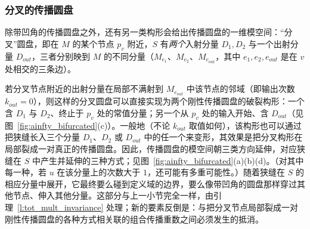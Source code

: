 \subsubsection{分叉的传播圆盘}\label{sss:bifurcated}

除带凹角的传播圆盘之外，还有另一类构形会给出传播圆盘的一维模空间：``分叉''圆盘，即在 $M$ 的某个节点 $p_v$ 附近，$S$ 有\emph{两个}入射分量 $D_1,D_2$ 与一个出射分量 $D_{out}$，三者分别映到 $M$ 的不同分量（$M_{e_1}$、$M_{e_2}$、$M_{e_{out}}$，其中 $e_1,e_2,e_{out}$ 是在 $v$ 处相交的三条边）。

若分叉节点附近的出射分量在局部不满射到 $M_{e_{out}}$ 中该节点的邻域（即输出次数 $k_{out}=0$），则这样的分叉圆盘可以直接实现为两个刚性传播圆盘的破裂构形：一个含 $D_1$ 与 $D_2$、终止于 $p_v$ 处的常值分量；另一个从 $p_v$ 处的输入开始、含 $D_{out}$（见图~\ref{fig:ainfty_bifurcated}(c)）。一般地（不论 $k_{out}$ 取值如何），该构形也可以通过把狭缝长入三个分量 $D_1$、$D_2$ 或 $D_{out}$ 中的任一个来变形，其效果是把分叉构形在局部裂成一对真正的传播圆盘。因此，传播圆盘的模空间朝三类方向延伸，对应狭缝在 $S$ 中产生并延伸的三种方式；见图~\ref{fig:ainfty_bifurcated}(a)(b)(d)。（对其中每一种，若 $u$ 在该分量上的次数大于 $1$，还可能有多重可能性。）随着狭缝在 $S$ 的相应分量中展开，它最终要么碰到定义域的边界，要么像带凹角的圆盘那样穿过其他节点、伸入其他分量。这部分与上一小节完全一样，由引理~\ref{l:tot_mult_invariance} 处理；新的要素反倒是：与把分叉节点局部裂成一对刚性传播圆盘的各种方式相关联的组合传播重数之间必须发生的抵消。

